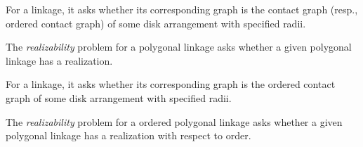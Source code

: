 \begin{prob}
For a linkage, it asks 
whether its corresponding graph is the contact graph (resp., ordered contact graph) of some disk 
arrangement with specified radii.
\end{prob}
\begin{prob}
The \emph{realizability} problem for a polygonal linkage asks whether a given polygonal linkage has 
a realization.
\end{prob}
\begin{prob}
For a linkage, it asks 
whether its corresponding graph is the ordered contact graph of some 
disk arrangement with specified radii.
\end{prob}
\begin{prob}
The \emph{realizability} problem for a ordered polygonal linkage asks whether a given polygonal 
linkage has a realization with respect to order.
\end{prob}